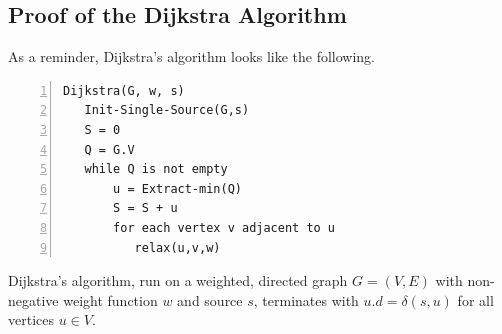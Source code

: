 \subsection{Proof of the Dijkstra Algorithm}

As a reminder, Dijkstra's algorithm looks like the following.

\begin{Verbatim}[numbers=left, xleftmargin=5mm]
Dijkstra(G, w, s)
   Init-Single-Source(G,s)
   S = 0
   Q = G.V
   while Q is not empty
       u = Extract-min(Q)
       S = S + u
       for each vertex v adjacent to u
          relax(u,v,w)
\end{Verbatim}

\begin{theorem} Dijkstra's algorithm, run on a weighted, directed graph $G = (V,E)$ with non-negative weight function $w$ and source $s$, terminates with $u.d = \delta(s,u)$ for all vertices $u \in V$.
\end{theorem}

